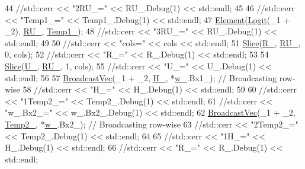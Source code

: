 \begin{DoxyCode}
44       \textcolor{comment}{//std::cerr << "2RU\_=" << RU\_.Debug(1) << std::endl;}
45 
46       \textcolor{comment}{//std::cerr << "Temp1\_=" << Temp1\_.Debug(1) << std::endl;}
47       \hyperlink{namespaceamunmt_1_1GPU_1_1mblas_adc0a1bee5e001b28e10bff88e940b284}{Element}(\hyperlink{namespacethrust_1_1detail_1_1functional_ab1596ca6efb2753919fc577c76541fd3}{Logit}(\_1 + \_2), \hyperlink{classamunmt_1_1GPU_1_1SlowGRU_a6d2c972c738d73a06832fc1c986c0661}{RU\_}, \hyperlink{classamunmt_1_1GPU_1_1SlowGRU_a016b0350577ab601124fb3fa00454bd5}{Temp1\_});
48       \textcolor{comment}{//std::cerr << "3RU\_=" << RU\_.Debug(1) << std::endl;}
49 
50       \textcolor{comment}{//std::cerr << "cols=" << cols << std::endl;}
51       \hyperlink{namespaceamunmt_1_1GPU_1_1mblas_aacbc57fa7bf5c1fac6abbd44a9832c8d}{Slice}(\hyperlink{classamunmt_1_1GPU_1_1SlowGRU_a6149bb77260336fc2fcb996efb869894}{R\_}, \hyperlink{classamunmt_1_1GPU_1_1SlowGRU_a6d2c972c738d73a06832fc1c986c0661}{RU\_}, 0, cols);
52       \textcolor{comment}{//std::cerr << "R\_=" << R\_.Debug(1) << std::endl;}
53 
54       \hyperlink{namespaceamunmt_1_1GPU_1_1mblas_aacbc57fa7bf5c1fac6abbd44a9832c8d}{Slice}(\hyperlink{classamunmt_1_1GPU_1_1SlowGRU_a1fe150f08247927994f75bd79f27a127}{U\_}, \hyperlink{classamunmt_1_1GPU_1_1SlowGRU_a6d2c972c738d73a06832fc1c986c0661}{RU\_}, 1, cols);
55       \textcolor{comment}{//std::cerr << "U\_=" << U\_.Debug(1) << std::endl;}
56 
57       \hyperlink{namespaceamunmt_1_1GPU_1_1mblas_ace73de50c8241f219ad490d64513829f}{BroadcastVec}(\_1 + \_2, \hyperlink{classamunmt_1_1GPU_1_1SlowGRU_afbccdac0afde1ede4ff4f78e3c2421f7}{H\_},    *\hyperlink{classamunmt_1_1GPU_1_1SlowGRU_a1391f44c8e8b746675cf8576401c8a71}{w\_}.Bx1\_); \textcolor{comment}{// Broadcasting row-wise}
58       \textcolor{comment}{//std::cerr << "H\_=" << H\_.Debug(1) << std::endl;}
59 
60       \textcolor{comment}{//std::cerr << "1Temp2\_=" << Temp2\_.Debug(1) << std::endl;}
61       \textcolor{comment}{//std::cerr << "w\_.Bx2\_=" << w\_.Bx2\_.Debug(1) << std::endl;}
62       \hyperlink{namespaceamunmt_1_1GPU_1_1mblas_ace73de50c8241f219ad490d64513829f}{BroadcastVec}(\_1 + \_2, \hyperlink{classamunmt_1_1GPU_1_1SlowGRU_a8db5f7a9fedce4e8ba545753e2e61c60}{Temp2\_}, *\hyperlink{classamunmt_1_1GPU_1_1SlowGRU_a1391f44c8e8b746675cf8576401c8a71}{w\_}.Bx2\_); \textcolor{comment}{// Broadcasting row-wise}
63       \textcolor{comment}{//std::cerr << "2Temp2\_=" << Temp2\_.Debug(1) << std::endl;}
64 
65       \textcolor{comment}{//std::cerr << "1H\_=" << H\_.Debug(1) << std::endl;}
66       \textcolor{comment}{//std::cerr << "R\_=" << R\_.Debug(1) << std::endl;}

\end{DoxyCode}
